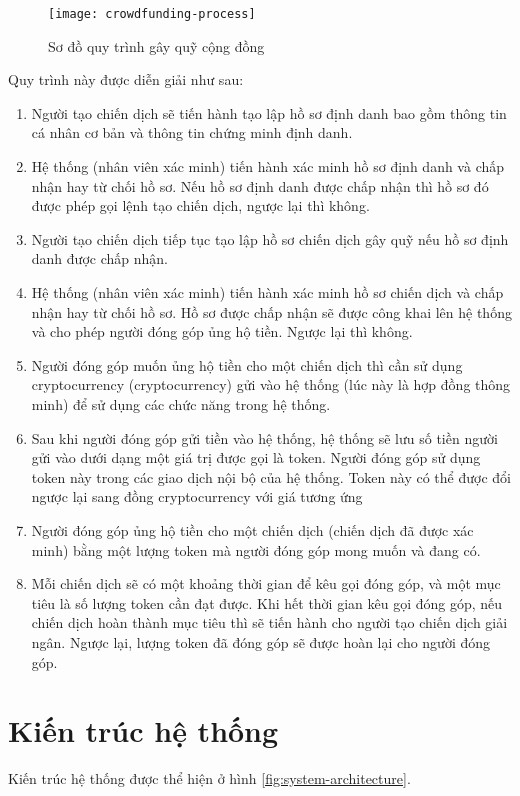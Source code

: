 \documentclass[../main-report.tex]{subfiles}
\begin{document}
\begin{figure}[ht!]
\begin{center}
\label{fig:crowdfunding-proccess}
\texttt{[image: crowdfunding-process]}
\caption{Sơ đồ quy trình gây quỹ cộng đồng}
\end{center}
\end{figure}

Quy trình này được diễn giải như sau:

\begin{enumerate}[label=(\arabic*)]
\item Người tạo chiến dịch sẽ tiến hành tạo lập hồ sơ định danh bao gồm thông tin cá nhân cơ bản và thông tin chứng minh định danh.
\item Hệ thống (nhân viên xác minh) tiến hành xác minh hồ sơ định danh và chấp nhận hay từ chối hồ sơ. Nếu hồ sơ định danh được chấp nhận thì hồ sơ đó được phép gọi lệnh tạo chiến dịch, ngược lại thì không.
\item Người tạo chiến dịch tiếp tục tạo lập hồ sơ chiến dịch gây quỹ nếu hồ sơ định danh được chấp nhận.
\item Hệ thống (nhân viên xác minh) tiến hành xác minh hồ sơ chiến dịch và chấp nhận hay từ chối hồ sơ. Hồ sơ được chấp nhận sẽ được công khai lên hệ thống và cho phép người đóng góp ủng hộ tiền. Ngược lại thì không.
\item Người đóng góp muốn ủng hộ tiền cho một chiến dịch thì cần sử dụng \gls{cryptocurrency} (\glsdesc{cryptocurrency}) gửi vào hệ thống (lúc này là hợp đồng thông minh) để sử dụng các chức năng trong hệ thống.
\item Sau khi người đóng góp gửi tiền vào hệ thống, hệ thống sẽ lưu số tiền người gửi vào dưới dạng một giá trị được gọi là token. Người đóng góp sử dụng token này trong các giao dịch nội bộ của hệ thống. Token này có thể được đổi ngược lại sang đồng \gls{cryptocurrency} với giá tương ứng
\item Người đóng góp ủng hộ tiền cho một chiến dịch (chiến dịch đã được xác minh) bằng một lượng token mà người đóng góp mong muốn và đang có.
\item Mỗi chiến dịch sẽ có một khoảng thời gian để kêu gọi đóng góp, và một mục tiêu là số lượng token cần đạt được. Khi hết thời gian kêu gọi đóng góp, nếu chiến dịch hoàn thành mục tiêu thì sẽ tiến hành cho người tạo chiến dịch giải ngân. Ngược lại, lượng token đã đóng góp sẽ được hoàn lại cho người đóng góp.
\end{enumerate}
\section{Kiến trúc hệ thống}
Kiến trúc hệ thống được thể hiện ở hình \ref{fig:system-architecture}.
\end{document}
